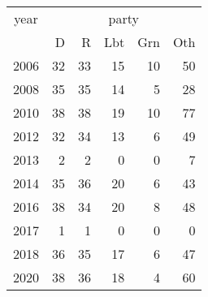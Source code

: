 \footnotesize\begin{tabular}[t]{lrrrrr}
\toprule
\multicolumn{1}{c}{year} & \multicolumn{5}{c}{party} \\
\cmidrule(l{3pt}r{3pt}){1-1} \cmidrule(l{3pt}r{3pt}){2-6}
  & D & R & Lbt & Grn & Oth\\
\midrule
2006 & 32 & 33 & 15 & 10 & 50\\
2008 & 35 & 35 & 14 & 5 & 28\\
2010 & 38 & 38 & 19 & 10 & 77\\
2012 & 32 & 34 & 13 & 6 & 49\\
2013 & 2 & 2 & 0 & 0 & 7\\
2014 & 35 & 36 & 20 & 6 & 43\\
2016 & 38 & 34 & 20 & 8 & 48\\
2017 & 1 & 1 & 0 & 0 & 0\\
2018 & 36 & 35 & 17 & 6 & 47\\
2020 & 38 & 36 & 18 & 4 & 60\\
\bottomrule
\end{tabular}
